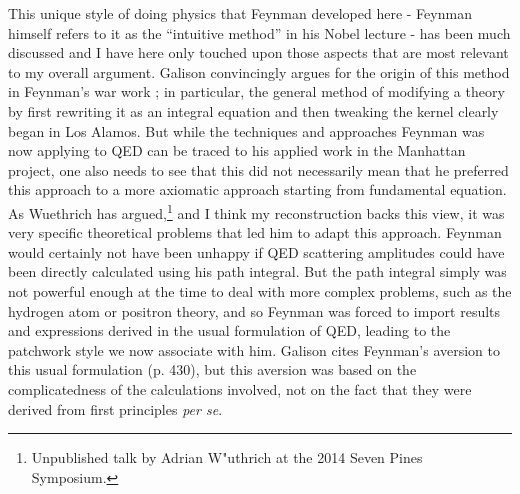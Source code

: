 \documentclass[12pt]{article}
\begin{document}
This unique style of doing physics that Feynman developed here - Feynman himself refers to it as the ``intuitive method'' in his Nobel lecture - has been much discussed and I have here only touched upon those aspects that are most relevant to my overall argument. Galison convincingly argues for the origin of this method in Feynman's war work \citep{galison_1998_feynmans}; in particular, the general method of modifying a theory by first rewriting it as an integral equation and then tweaking the kernel clearly began in Los Alamos. But while the techniques and approaches Feynman was now applying to QED can be traced to his applied work in the Manhattan project, one also needs to see that this did not necessarily mean that he preferred this approach to a more axiomatic approach starting from fundamental equation. As Wuethrich has argued,\footnote{Unpublished talk by Adrian W"uthrich at the 2014 Seven Pines Symposium.} and I think my reconstruction backs this view, it was very specific theoretical problems that led him to adapt this approach. Feynman would certainly not have been unhappy if QED scattering amplitudes could have been directly calculated using his path integral. But the path integral simply was not powerful enough at the time to deal with more complex problems, such as the hydrogen atom or positron theory, and so Feynman was forced to import results and expressions derived in the usual formulation of QED, leading to the patchwork style we now associate with him. Galison cites Feynman's aversion to this usual formulation (p. 430), but this aversion was based on the complicatedness of the calculations involved, not on the fact that they were derived from first principles \emph{per se}.
\end{document}
